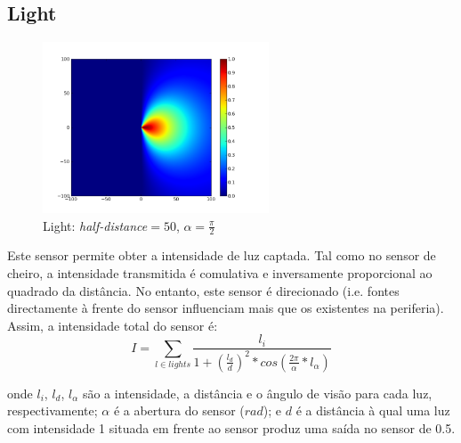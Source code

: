 \documentclass[a4paper]{article}
\begin{document}
\subsection{Light}
\begin{figure}[h]
	\vspace{-20pt}
	\begin{center}
		\includegraphics[width=0.6\textwidth]{graphs/sensors/light.png}
	\end{center}
	\vspace{-20pt}
	\caption{Light: \emph{half-distance}$=50$, $\alpha=\frac{\pi}{2}$}
\end{figure}

\indent Este sensor permite obter a intensidade de luz captada. Tal como no sensor de cheiro, a intensidade transmitida
é comulativa e inversamente proporcional ao quadrado da distância. No entanto, este sensor é direcionado (i.e. fontes
directamente à frente do sensor influenciam mais que os existentes na periferia). Assim, a intensidade total do sensor é:
\[
	I = \displaystyle\sum\limits_{l \in lights} \frac{l_{i}}{1 + (\frac{l_{d}}{d})^{2}*cos(\frac{2\pi}{\alpha}*l_{\alpha})}
\]

onde $l_{i}$, $l_{d}$, $l_{\alpha}$ são a intensidade, a distância e o ângulo de visão para cada luz, respectivamente;
$\alpha$ é a abertura do sensor ($rad$);
e $d$ é a distância à qual uma luz com intensidade 1 situada em frente ao sensor produz uma saída no sensor de 0.5.

\cleardoublepage
\end{document}
